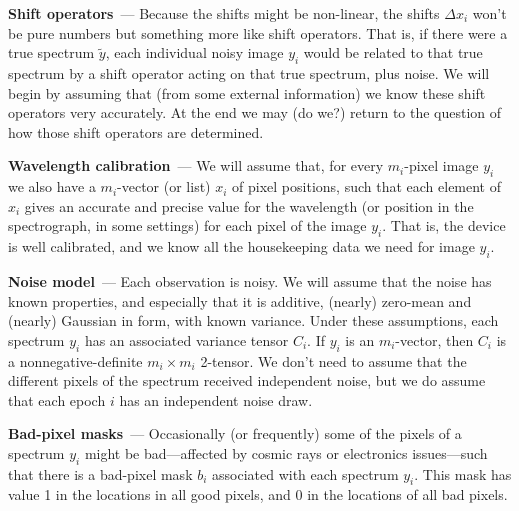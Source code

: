 \documentclass[11pt]{article}
\renewcommand{\paragraph}[1]{\medskip\par\noindent\textbf{#1}~---}
\begin{document}
\paragraph{Shift operators}
Because the shifts might be non-linear, the shifts $\Delta x_i$ won't be pure numbers but something more like shift operators.
That is, if there were a true spectrum $\tilde{y}$, each individual noisy image $y_i$ would be related to that true spectrum by a shift operator acting on that true spectrum, plus noise.
We will begin by assuming that (from some external information) we know these shift operators very accurately.
At the end we may (do we?) return to the question of how those shift operators are determined.

\paragraph{Wavelength calibration}
We will assume that, for every $m_i$-pixel image $y_i$ we also have a $m_i$-vector (or list) $x_i$ of pixel positions, such that each element of $x_i$ gives an accurate and precise value for the wavelength (or position in the spectrograph, in some settings) for each pixel of the image $y_i$.
That is, the device is well calibrated, and we know all the housekeeping data we need for image $y_i$.

\paragraph{Noise model}
Each observation is noisy.
We will assume that the noise has known properties, and especially that it is additive, (nearly) zero-mean and (nearly) Gaussian in form, with known variance.
Under these assumptions, each spectrum $y_i$ has an associated variance tensor $C_i$.
If $y_i$ is an $m_i$-vector, then $C_i$ is a nonnegative-definite $m_i\times m_i$ 2-tensor.
We don't need to assume that the different pixels of the spectrum received independent noise, but we do assume that each epoch $i$ has an independent noise draw.

\paragraph{Bad-pixel masks}
Occasionally (or frequently) some of the pixels of a spectrum $y_i$ might be bad---affected by cosmic rays or electronics issues---such that there is a bad-pixel mask $b_i$ associated with each spectrum $y_i$.
This mask has value 1 in the locations in all good pixels, and 0 in the locations of all bad pixels.
\end{document}

